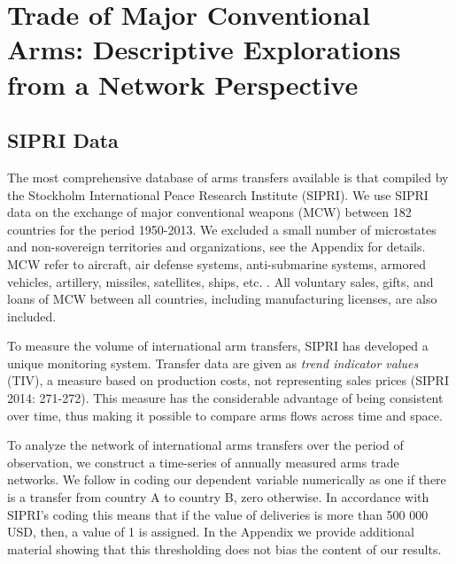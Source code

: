 \documentclass[12pt, letterpaper]{article}
\numberwithin{equation}{section}
\begin{document}
 
\section{\large Trade of Major Conventional Arms: Descriptive Explorations from a Network Perspective}
 \subsection{SIPRI Data}
 
The most comprehensive database of arms transfers available is that compiled by the Stockholm International Peace Research Institute (SIPRI). 
We use SIPRI data on the exchange of major conventional weapons (MCW) between 182 countries for the period 1950-2013. 
We excluded a small number of microstates and non-sovereign territories and organizations, see the Appendix for details. MCW refer to aircraft, air defense systems, anti-submarine systems, armored vehicles, artillery, missiles, satellites, ships, etc. \citep{SIPRI:14}. 
All voluntary sales, gifts, and loans of MCW between all countries, including manufacturing licenses, are also included. 

To measure the volume of international arm transfers, SIPRI has developed a unique monitoring system. 
Transfer data are given as \textit{trend indicator values} (TIV), a measure based on production costs, not representing sales prices (SIPRI 2014: 271-272).
This measure has the considerable advantage of being consistent over time, thus making it possible to compare arms flows across time and space. 


To analyze the network of international arms transfers over the period of observation, we construct a time-series of annually measured arms trade networks. We follow \citet{AkerSeim:14} in coding our dependent variable numerically as one if there is a transfer from country A to country B, zero otherwise. In accordance with SIPRI's coding this means that if the value of deliveries is more than 500 000 USD, then, a value of 1 is assigned. 
In the Appendix we provide additional material showing that this thresholding does not bias the content of our results. 
\end{document}
